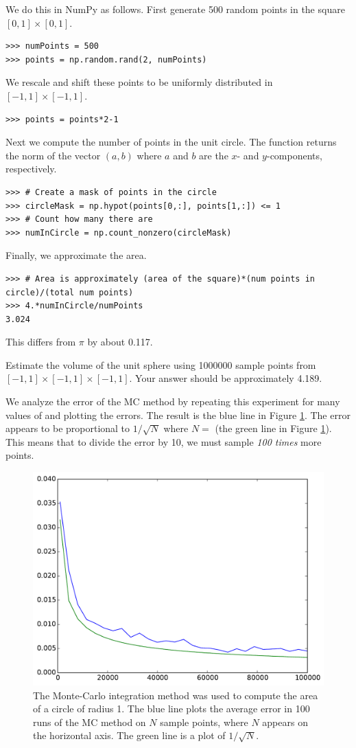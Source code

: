 We do this in NumPy as follows. First generate 500 random points in the square $[0,1] \times [0,1]$.
\begin{lstlisting}
>>> numPoints = 500
>>> points = np.random.rand(2, numPoints)
\end{lstlisting}
We rescale and shift these points to be uniformly distributed in $[-1,1]\times[-1,1]$.
\begin{lstlisting}
>>> points = points*2-1
\end{lstlisting}
Next we compute the number of points in the unit circle.
The function  returns the norm of the vector $(a, b)$ where $a$ and $b$ are the $x$- and $y$-components, respectively.
\begin{lstlisting}
>>> # Create a mask of points in the circle
>>> circleMask = np.hypot(points[0,:], points[1,:]) <= 1
>>> # Count how many there are
>>> numInCircle = np.count_nonzero(circleMask)
\end{lstlisting}
Finally, we approximate the area.
\begin{lstlisting}
>>> # Area is approximately (area of the square)*(num points in circle)/(total num points)
>>> 4.*numInCircle/numPoints
3.024
\end{lstlisting}
This differs from $\pi$ by about 0.117.

\begin{problem}
\label{prob:sphere}
Estimate the volume of the unit sphere using 1000000 sample points from $[-1,1]\times[-1,1]\times[-1,1]$. Your answer should be approximately 4.189.
\end{problem}

We analyze the error of the MC method by repeating this experiment for many values of  and plotting the errors.
The result is the blue line in Figure \ref{fig:mc_error}.
The error appears to be proportional to $1/\sqrt{N}$ where $N=$  (the green line in Figure \ref{fig:mc_error}).
This means that to divide the error by 10, we must sample \emph{100 times} more points.

\begin{figure}
\includegraphics[width=.7\textwidth]{mc_error.pdf}
\caption{The Monte-Carlo integration method was used to compute the area of a circle of radius 1. 
The blue line plots the average error in 100 runs of the MC method on $N$ sample points, where $N$ appears on the horizontal axis.
The green line is a plot of $1/\sqrt{N}$. }
\label{fig:mc_error}
\end{figure}

